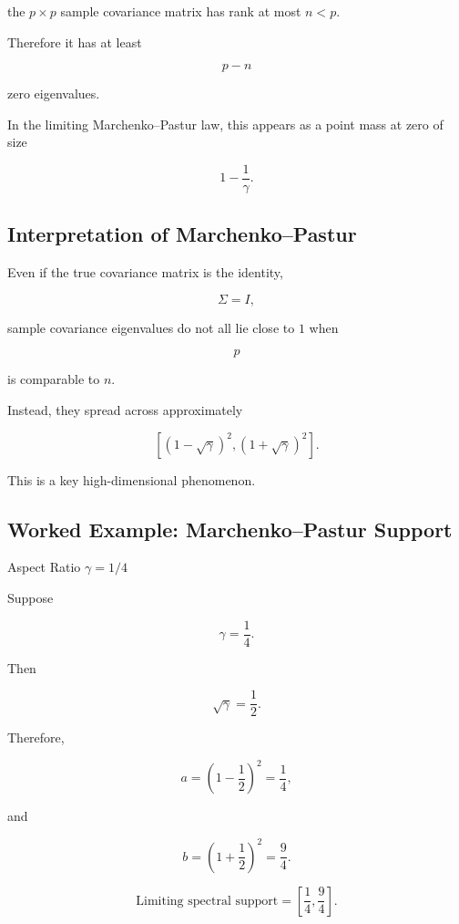 the \(p\times p\) sample covariance matrix has rank at most \(n<p\).

Therefore it has at least

\[
p-n
\]

zero eigenvalues.

In the limiting Marchenko--Pastur law, this appears as a point mass at
zero of size

\[
\boxed{
1-\frac1\gamma.
}
\]

\subsection{Interpretation of Marchenko--Pastur}
\label{subsec:interpret-marchenko-pastur}

Even if the true covariance matrix is the identity,

\[
\Sigma=I,
\]

sample covariance eigenvalues do not all lie close to \(1\) when

\[
p
\]

is comparable to \(n\).

Instead, they spread across approximately

\[
\boxed{
\left[
(1-\sqrt{\gamma})^2,
(1+\sqrt{\gamma})^2
\right].
}
\]

This is a key high-dimensional phenomenon.

\subsection{Worked Example: Marchenko--Pastur Support}
\label{subsec:worked-mp-support}

\begin{workedexamplebox}{Aspect Ratio \(\gamma=1/4\)}

Suppose

\[
\gamma
=
\frac14.
\]

Then

\[
\sqrt{\gamma}
=
\frac12.
\]

Therefore,

\[
a
=
\left(
1-\frac12
\right)^2
=
\frac14,
\]

and

\[
b
=
\left(
1+\frac12
\right)^2
=
\frac94.
\]

\begin{answerbox}
\[
\boxed{
\text{Limiting spectral support}
=
\left[
\frac14,
\frac94
\right].
}
\]
\end{answerbox}

\end{workedexamplebox}

